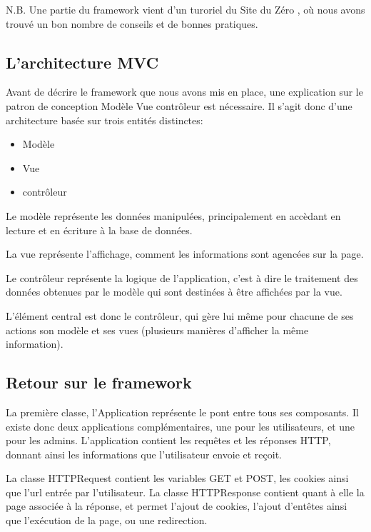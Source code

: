 N.B. Une partie du framework vient d'un turoriel du Site du Zéro \cite{ref_framework_mvc}, 
où nous avons trouvé un bon nombre de conseils et de bonnes pratiques.

        \subsection{L'architecture MVC}
Avant de décrire le framework que nous avons mis en place, une explication sur le patron de conception Modèle Vue contrôleur
est nécessaire. Il s'agit donc d'une architecture basée sur trois entités distinctes:

    \begin{itemize}
    \item Modèle
    \item Vue
    \item contrôleur
    \end{itemize}

Le modèle représente les données manipulées, principalement en accèdant en lecture et en écriture à la base de données.

La vue représente l'affichage, comment les informations sont agencées sur la page.

Le contrôleur représente la logique de l'application, c'est à dire le traitement des données obtenues par le modèle
qui sont destinées à être affichées par la vue.

L'élément central est donc le contrôleur, qui gère lui même pour chacune de ses actions son modèle et ses vues (plusieurs
manières d'afficher la même information).

        \subsection{Retour sur le framework}

La première classe, l'Application représente le pont entre tous ses composants. Il existe donc deux applications complémentaires, une pour les utilisateurs, et une pour les admins.
L'application contient les requêtes et les réponses HTTP, donnant ainsi les informations que l'utilisateur envoie et reçoit.

La classe HTTPRequest contient les variables GET et POST, les cookies ainsi que l'url entrée par l'utilisateur.
La classe HTTPResponse contient quant à elle la page associée à la réponse, et permet l'ajout de cookies, l'ajout d'entêtes
ainsi que l'exécution de la page, ou une redirection.

